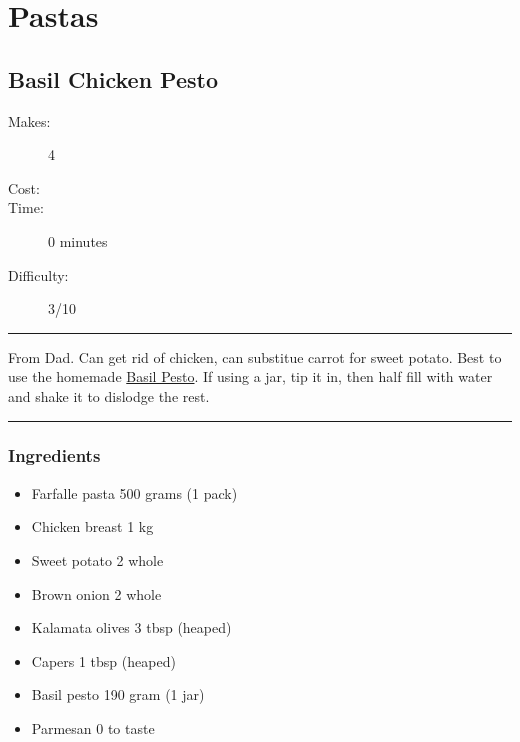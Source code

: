 \documentclass[]{article}
\begin{document}
\section*{\center\Huge\color{accent}Pastas}
\label{cat:Pastas}
\label{rec:Basil Chicken Pesto}
\subsection*{\center\huge Basil Chicken Pesto}
\begin{description}
\item[Makes:] 4 
\item[Cost:] \textdollar
\item[Time:] 0 minutes
\item[Difficulty:] 3/10
\end{description}
\vspace{0.2cm}\hrule\vspace{0.5cm}
\begin{adjustwidth}{0.5 cm}{0.5 cm}

From Dad. Can get rid of chicken, can substitue carrot for sweet potato. Best to use the homemade \hyperref[rec:Basil Pesto]{Basil Pesto}. If using a jar, tip it in, then half fill with water and shake it to dislodge the rest. \hfill{}\color{black}

\end{adjustwidth}
\vspace{0.5cm}\hrule
\subsubsection*{\Large Ingredients}
\begin{multicols}{2}
\begin{itemize}
 \item Farfalle pasta \hfill 500 grams (1 pack)
 \item Chicken breast \hfill 1 kg
 \item Sweet potato \hfill 2 whole
 \item Brown onion \hfill 2 whole
 \item Kalamata olives \hfill 3 tbsp (heaped)
 \item Capers \hfill 1 tbsp (heaped)
 \item Basil pesto \hfill 190 gram (1 jar)
 \item Parmesan \hfill 0 to taste
\end{itemize}
\end{multicols}
\end{document}
